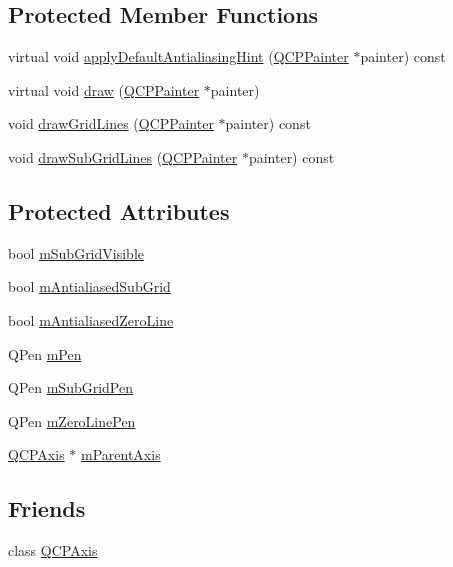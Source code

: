 \subsection*{Protected Member Functions}
\begin{DoxyCompactItemize}
\item 
virtual void \hyperlink{classQCPGrid_a9916f5e38b4d6cae446537aeb47c7272}{apply\+Default\+Antialiasing\+Hint} (\hyperlink{classQCPPainter}{Q\+C\+P\+Painter} $\ast$painter) const 
\item 
virtual void \hyperlink{classQCPGrid_ad009c23f96078616aa4f66a750974b23}{draw} (\hyperlink{classQCPPainter}{Q\+C\+P\+Painter} $\ast$painter)
\item 
void \hyperlink{classQCPGrid_a3aff10e993f6625e255c19e4f97a09d8}{draw\+Grid\+Lines} (\hyperlink{classQCPPainter}{Q\+C\+P\+Painter} $\ast$painter) const 
\item 
void \hyperlink{classQCPGrid_afa5d9d12de419e881f381f2ab7cb414d}{draw\+Sub\+Grid\+Lines} (\hyperlink{classQCPPainter}{Q\+C\+P\+Painter} $\ast$painter) const 
\end{DoxyCompactItemize}
\subsection*{Protected Attributes}
\begin{DoxyCompactItemize}
\item 
bool \hyperlink{classQCPGrid_a4e4a0400d6319bb44c06341f6298c87b}{m\+Sub\+Grid\+Visible}
\item 
bool \hyperlink{classQCPGrid_a71b7051f833f0c5de3094998d6afdd87}{m\+Antialiased\+Sub\+Grid}
\item 
bool \hyperlink{classQCPGrid_a8c0df56ae86440408c050895dcdb922b}{m\+Antialiased\+Zero\+Line}
\item 
Q\+Pen \hyperlink{classQCPGrid_a1cdc4a3bccf6a40c2d4360def9fefa40}{m\+Pen}
\item 
Q\+Pen \hyperlink{classQCPGrid_aa9004bc139ad3ea92629f0aaae81d83f}{m\+Sub\+Grid\+Pen}
\item 
Q\+Pen \hyperlink{classQCPGrid_a379481871f17655c27eda30af233554f}{m\+Zero\+Line\+Pen}
\item 
\hyperlink{classQCPAxis}{Q\+C\+P\+Axis} $\ast$ \hyperlink{classQCPGrid_a9a8a76731e6e737b65b929fd1995cc88}{m\+Parent\+Axis}
\end{DoxyCompactItemize}
\subsection*{Friends}
\begin{DoxyCompactItemize}
\item 
class \hyperlink{classQCPGrid_af123edeca169ec7a31958a1d714e1a8a}{Q\+C\+P\+Axis}
\end{DoxyCompactItemize}
